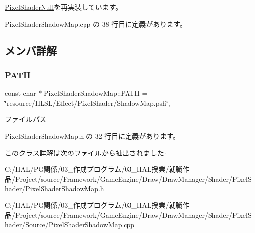 \mbox{\hyperlink{class_pixel_shader_null_adca4c44cd25c90a5ebd75b459f5e641e}{Pixel\+Shader\+Null}}を再実装しています。



 Pixel\+Shader\+Shadow\+Map.\+cpp の 38 行目に定義があります。



\subsection{メンバ詳解}
\mbox{\label{class_pixel_shader_shadow_map_ae815bcdd558c5618b7b03f7512888ad2}} 
\subsubsection{\texorpdfstring{P\+A\+TH}{PATH}}
{\footnotesize\ttfamily const char $\ast$ Pixel\+Shader\+Shadow\+Map\+::\+P\+A\+TH = \char`\"{}resource/H\+L\+SL/Effect/Pixel\+Shader/Shadow\+Map.\+psh\char`\"{}\hspace{0.3cm}{\ttfamily [static]}, {\ttfamily [private]}}



ファイルパス 



 Pixel\+Shader\+Shadow\+Map.\+h の 32 行目に定義があります。



このクラス詳解は次のファイルから抽出されました\+:\begin{DoxyCompactItemize}
\item 
C\+:/\+H\+A\+L/\+P\+G関係/03\+\_\+作成プログラム/03\+\_\+\+H\+A\+L授業/就職作品/\+Project/source/\+Framework/\+Game\+Engine/\+Draw/\+Draw\+Manager/\+Shader/\+Pixel\+Shader/\mbox{\hyperlink{_pixel_shader_shadow_map_8h}{Pixel\+Shader\+Shadow\+Map.\+h}}\item 
C\+:/\+H\+A\+L/\+P\+G関係/03\+\_\+作成プログラム/03\+\_\+\+H\+A\+L授業/就職作品/\+Project/source/\+Framework/\+Game\+Engine/\+Draw/\+Draw\+Manager/\+Shader/\+Pixel\+Shader/\+Source/\mbox{\hyperlink{_pixel_shader_shadow_map_8cpp}{Pixel\+Shader\+Shadow\+Map.\+cpp}}\end{DoxyCompactItemize}
